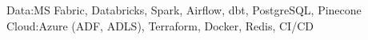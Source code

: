 \documentclass[]{resume-openfont}
\begin{document}
\begin{skillList}
    {Data:}{MS Fabric, Databricks, Spark, Airflow, dbt, PostgreSQL, Pinecone}
    \\
    {Cloud:}{Azure (ADF, ADLS), Terraform, Docker, Redis, CI/CD}%
    \\
    
\end{skillList}
\end{document}
